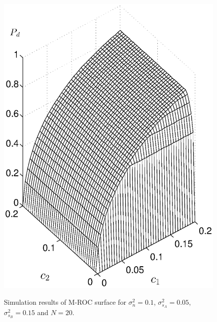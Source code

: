 \begin{figure}[!t]
\centering
\includegraphics[width=12cm, height=16cm]{4/c1c2pd.eps}
\caption{Simulation results of M-ROC surface for $\sigma_n^2 = 0.1$, $\sigma_{s_A}^2=0.05$, $\sigma_{s_B}^2=0.15$ and $N = 20$.}
\label{pic:2015may1}
\end{figure}

